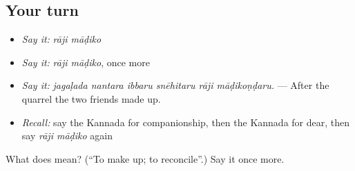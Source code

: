 \subsection*{Your turn}
\begin{itemize}
\raggedright
  \item \emph{Say it:} \emph{rāji māḍiko}
  \item \emph{Say it:} \emph{rāji māḍiko}, once more
  \item \emph{Say it:} \emph{jagaḷada nantara ibbaru snēhitaru rāji māḍikoṇḍaru.} — After the quarrel the two friends made up.
  \item \emph{Recall:} say the Kannada for companionship, then the Kannada for dear, then say \emph{rāji māḍiko} again
\end{itemize}

\begin{tcolorbox}[breakable,colback=teal!4,colframe=teal!35!black,title={Before you move on}]
What does   mean? (\textquotedblleft{}To make up; to reconcile\textquotedblright{}.) Say it once more.
\end{tcolorbox}
